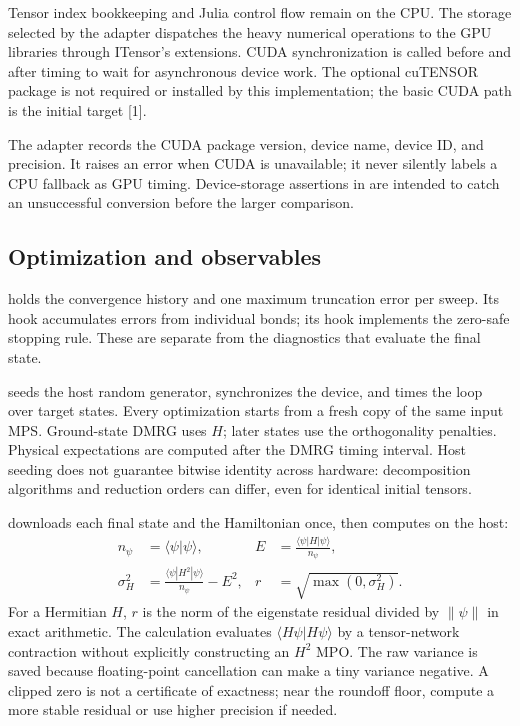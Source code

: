 Tensor index bookkeeping and Julia control flow remain on the CPU. The storage selected by the adapter dispatches the heavy numerical operations to the GPU libraries through ITensor's extensions. CUDA synchronization is called before and after timing to wait for asynchronous device work. The optional cuTENSOR package is not required or installed by this implementation; the basic CUDA path is the initial target [1].

The adapter records the CUDA package version, device name, device ID, and precision. It raises an error when CUDA is unavailable; it never silently labels a CPU fallback as GPU timing. Device-storage assertions in  are intended to catch an unsuccessful conversion before the larger comparison.

\subsection{Optimization and observables}
 holds the convergence history and one maximum truncation error per sweep. Its  hook accumulates errors from individual bonds; its  hook implements the zero-safe stopping rule. These are separate from the diagnostics that evaluate the final state.

 seeds the host random generator, synchronizes the device, and times the loop over target states. Every optimization starts from a fresh copy of the same input MPS. Ground-state DMRG uses $H$; later states use the orthogonality penalties. Physical expectations are computed after the DMRG timing interval. Host seeding does not guarantee bitwise identity across hardware: decomposition algorithms and reduction orders can differ, even for identical initial tensors.

 downloads each final state and the Hamiltonian once, then computes on the host:
\begin{align}
n_\psi &= \langle\psi|\psi\rangle, &
E&=\frac{\langle\psi|H|\psi\rangle}{n_\psi},\\
\sigma_H^2&=\frac{\langle\psi|H^2|\psi\rangle}{n_\psi}-E^2, &
r&=\sqrt{\max(0,\sigma_H^2)}.
\end{align}
For a Hermitian $H$, $r$ is the norm of the eigenstate residual divided by $\|\psi\|$ in exact arithmetic. The calculation evaluates $\langle H\psi|H\psi\rangle$ by a tensor-network contraction without explicitly constructing an $H^2$ MPO. The raw variance is saved because floating-point cancellation can make a tiny variance negative. A clipped zero is not a certificate of exactness; near the roundoff floor, compute a more stable residual or use higher precision if needed.

